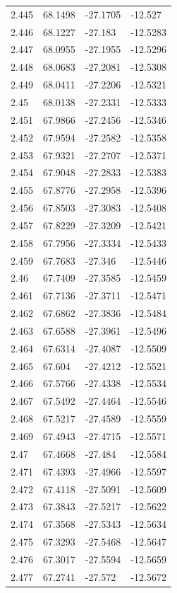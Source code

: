 \begin{tabular}{llll}
2.445 & 68.1498 & -27.1705 & -12.527 \\
2.446 & 68.1227 & -27.183 & -12.5283 \\
2.447 & 68.0955 & -27.1955 & -12.5296 \\
2.448 & 68.0683 & -27.2081 & -12.5308 \\
2.449 & 68.0411 & -27.2206 & -12.5321 \\
2.45 & 68.0138 & -27.2331 & -12.5333 \\
2.451 & 67.9866 & -27.2456 & -12.5346 \\
2.452 & 67.9594 & -27.2582 & -12.5358 \\
2.453 & 67.9321 & -27.2707 & -12.5371 \\
2.454 & 67.9048 & -27.2833 & -12.5383 \\
2.455 & 67.8776 & -27.2958 & -12.5396 \\
2.456 & 67.8503 & -27.3083 & -12.5408 \\
2.457 & 67.8229 & -27.3209 & -12.5421 \\
2.458 & 67.7956 & -27.3334 & -12.5433 \\
2.459 & 67.7683 & -27.346 & -12.5446 \\
2.46 & 67.7409 & -27.3585 & -12.5459 \\
2.461 & 67.7136 & -27.3711 & -12.5471 \\
2.462 & 67.6862 & -27.3836 & -12.5484 \\
2.463 & 67.6588 & -27.3961 & -12.5496 \\
2.464 & 67.6314 & -27.4087 & -12.5509 \\
2.465 & 67.604 & -27.4212 & -12.5521 \\
2.466 & 67.5766 & -27.4338 & -12.5534 \\
2.467 & 67.5492 & -27.4464 & -12.5546 \\
2.468 & 67.5217 & -27.4589 & -12.5559 \\
2.469 & 67.4943 & -27.4715 & -12.5571 \\
2.47 & 67.4668 & -27.484 & -12.5584 \\
2.471 & 67.4393 & -27.4966 & -12.5597 \\
2.472 & 67.4118 & -27.5091 & -12.5609 \\
2.473 & 67.3843 & -27.5217 & -12.5622 \\
2.474 & 67.3568 & -27.5343 & -12.5634 \\
2.475 & 67.3293 & -27.5468 & -12.5647 \\
2.476 & 67.3017 & -27.5594 & -12.5659 \\
2.477 & 67.2741 & -27.572 & -12.5672 \\

\end{tabular}
